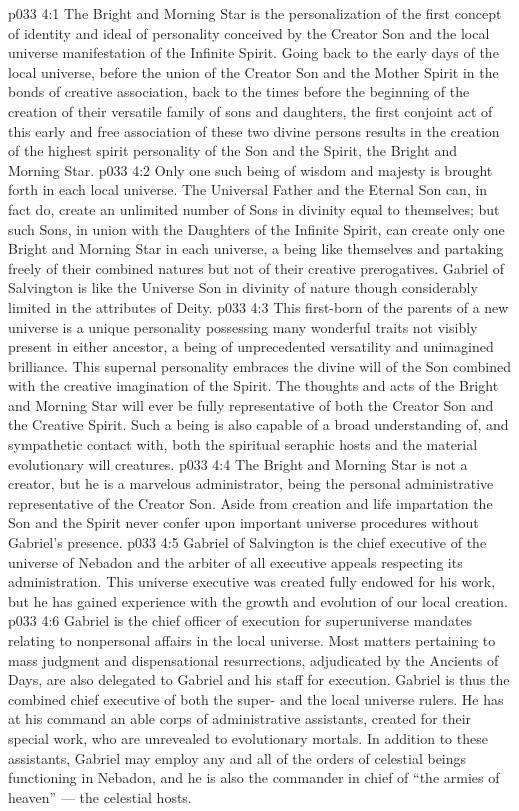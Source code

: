 \vs p033 4:1 The Bright and Morning Star is the personalization of the first concept of identity and ideal of personality conceived by the Creator Son and the local universe manifestation of the Infinite Spirit. Going back to the early days of the local universe, before the union of the Creator Son and the Mother Spirit in the bonds of creative association, back to the times before the beginning of the creation of their versatile family of sons and daughters, the first conjoint act of this early and free association of these two divine persons results in the creation of the highest spirit personality of the Son and the Spirit, the Bright and Morning Star.
\vs p033 4:2 Only one such being of wisdom and majesty is brought forth in each local universe. The Universal Father and the Eternal Son can, in fact do, create an unlimited number of Sons in divinity equal to themselves; but such Sons, in union with the Daughters of the Infinite Spirit, can create only one Bright and Morning Star in each universe, a being like themselves and partaking freely of their combined natures but not of their creative prerogatives. Gabriel of Salvington is like the Universe Son in divinity of nature though considerably limited in the attributes of Deity.
\vs p033 4:3 This first\hyp{}born of the parents of a new universe is a unique personality possessing many wonderful traits not visibly present in either ancestor, a being of unprecedented versatility and unimagined brilliance. This supernal personality embraces the divine will of the Son combined with the creative imagination of the Spirit. The thoughts and acts of the Bright and Morning Star will ever be fully representative of both the Creator Son and the Creative Spirit. Such a being is also capable of a broad understanding of, and sympathetic contact with, both the spiritual seraphic hosts and the material evolutionary will creatures.
\vs p033 4:4 \pc The Bright and Morning Star is not a creator, but he is a marvelous administrator, being the personal administrative representative of the Creator Son. Aside from creation and life impartation the Son and the Spirit never confer upon important universe procedures without Gabriel’s presence.
\vs p033 4:5 Gabriel of Salvington is the chief executive of the universe of Nebadon and the arbiter of all executive appeals respecting its administration. This universe executive was created fully endowed for his work, but he has gained experience with the growth and evolution of our local creation.
\vs p033 4:6 Gabriel is the chief officer of execution for superuniverse mandates relating to nonpersonal affairs in the local universe. Most matters pertaining to mass judgment and dispensational resurrections, adjudicated by the Ancients of Days, are also delegated to Gabriel and his staff for execution. Gabriel is thus the combined chief executive of both the super\hyp{} and the local universe rulers. He has at his command an able corps of administrative assistants, created for their special work, who are unrevealed to evolutionary mortals. In addition to these assistants, Gabriel may employ any and all of the orders of celestial beings functioning in Nebadon, and he is also the commander in chief of “the armies of heaven” --- the celestial hosts.
